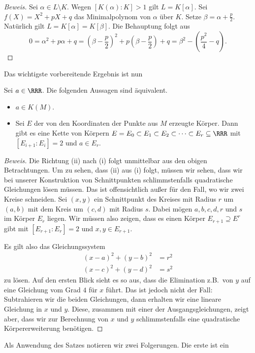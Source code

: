 \documentclass[12pt,a4paper,twoside]{article}
\begin{document}
\begin{proof}[Beweis]
  Sei $\alpha\in L\setminus K$. Wegen $[K(\alpha):K]>1$ gilt
  $L=K[\alpha]$. Sei $f(X)=X^2+pX+q$ das Minimalpolynom von $\alpha$ \"uber
  $K$. Setze $\beta=\alpha+\frac{p}{2}$. Nat\"urlich gilt
  $L=K[\alpha]=K[\beta]$. Die Behauptung folgt aus
\[
0=\alpha^2+p\alpha+q=(\beta-\frac{p}{2})^2+p(\beta-\frac{p}{2})+q =
\beta^2-(\frac{p^2}{4}-q).
\]
\end{proof}
Das wichtigste vorbereitende Ergebnis ist nun
\begin{Satz}
  Sei $a\in\RRR$. Die folgenden Aussagen sind \"aquivalent.
  \begin{itemize}
  \item[(i)] $a\in K(M)$.
  \item[(ii)] Sei $E$ der von den Koordinaten der Punkte aus $M$ erzeugte
    K\"orper. Dann gibt es eine Kette von K\"orpern $E=E_0\subset E_1\subset
    E_2\subset\dots\subset E_r\subseteq\RRR$ mit $[E_{i+1}:E_{i}]=2$ und $a\in
    E_r$.
  \end{itemize}
\end{Satz}
\begin{proof}[Beweis]
  Die Richtung (ii) nach (i) folgt unmittelbar aus den obigen Betrachtungen.
  Um zu sehen, dass (ii) aus (i) folgt, m\"ussen wir sehen, dass wir bei
  unserer Konstruktion von Schnittpunkten schlimmstenfalls quadratische
  Gleichungen l\"osen m\"ussen. Das ist offensichtlich au\ss er f\"ur den
  Fall, wo wir zwei Kreise schneiden. Sei $(x,y)$ ein Schnittpunkt des Kreises
  mit Radius $r$ um $(a,b)$ mit dem Kreis um $(c,d)$ mit Radius $s$. Dabei
  m\"ogen $a,b,c,d,r$ und $s$ im K\"orper $E_r$ liegen. Wir m\"ussen also
  zeigen, dass es einen K\"orper $E_{r+1}\supseteq E^{r}$ gibt mit
  $[E_{r+1}:E_r]=2$ und $x,y\in E_{r+1}$.

Es gilt also das Gleichungssystem
\begin{align*}
  (x-a)^2+(y-b)^2 &= r^2\\
  (x-c)^2+(y-d)^2 &= s^2
\end{align*}
zu l\"osen. Auf den ersten Blick sieht es so aus, dass die Elimination z.B.\ 
von $y$ auf eine Gleichung vom Grad $4$ f\"ur $x$ f\"uhrt. Das ist jedoch
nicht der Fall: Subtrahieren wir die beiden Gleichungen, dann erhalten wir
eine lineare Gleichung in $x$ und $y$. Diese, zusammen mit einer der
Ausgangsgleichungen, zeigt aber, dass wir zur Berechnung von $x$ und $y$
schlimmstenfalls eine quadratische K\"orpererweiterung ben\"otigen.
\end{proof}
Als Anwendung des Satzes notieren wir zwei Folgerungen. Die erste ist ein
\end{document}
